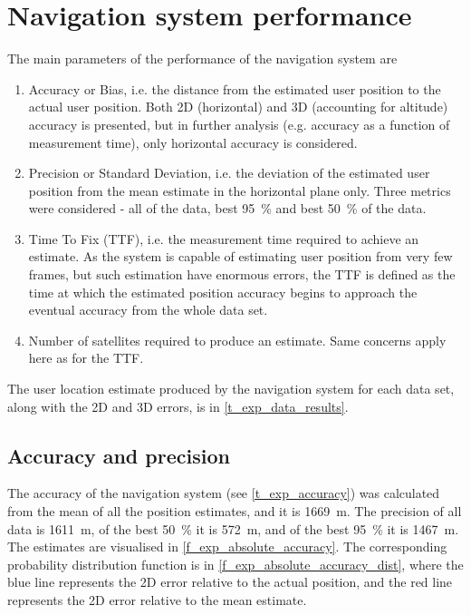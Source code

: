 \section{Navigation system performance}
The main parameters of the performance of the navigation system are
\begin{enumerate}
    \item Accuracy or Bias, i.e. the distance from the estimated user position to the actual user position. Both 2D (horizontal) and 3D (accounting for altitude) accuracy is presented, but in further analysis (e.g. accuracy as a function of measurement time), only horizontal accuracy is considered.
    \item Precision or Standard Deviation, i.e. the deviation of the estimated user position from the mean estimate in the horizontal plane only. Three metrics were considered - all of the data, best \qty{95}{\percent} and best \qty{50}{\percent} of the data.
    \item Time To Fix (TTF), i.e. the measurement time required to achieve an estimate. As the system is capable of estimating user position from very few frames, but such estimation have enormous errors, the TTF is defined as the time at which the estimated position accuracy begins to approach the eventual accuracy from the whole data set.
    \item Number of satellites required to produce an estimate. Same concerns apply here as for the TTF.
\end{enumerate}

The user location estimate produced by the navigation system for each data set, along with the 2D and 3D errors, is in \autoref{t_exp_data_results}.


\subsection{Accuracy and precision}
The accuracy of the navigation system (see \autoref{t_exp_accuracy}) was calculated from the mean of all the position estimates, and it is \qty{1669}{m}. The precision of all data is \qty{1611}{m}, of the best \qty{50}{\percent} it is \qty{572}{m}, and of the best \qty{95}{\percent} it is \qty{1467}{m}. The estimates are visualised in \autoref{f_exp_absolute_accuracy}.  The corresponding probability distribution function is in \autoref{f_exp_absolute_accuracy_dist}, where the blue line represents the 2D error relative to the actual position, and the red line represents the 2D error relative to the mean estimate.


